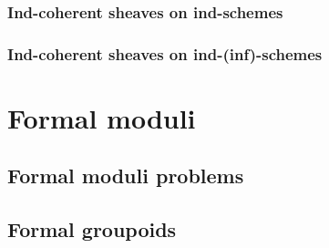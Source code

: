         \subsubsection{Ind-coherent sheaves on ind-schemes}
        
        \subsubsection{Ind-coherent sheaves on ind-(inf)-schemes}
    
\section{Formal moduli}
    \subsection{Formal moduli problems}
    
    \subsection{Formal groupoids}